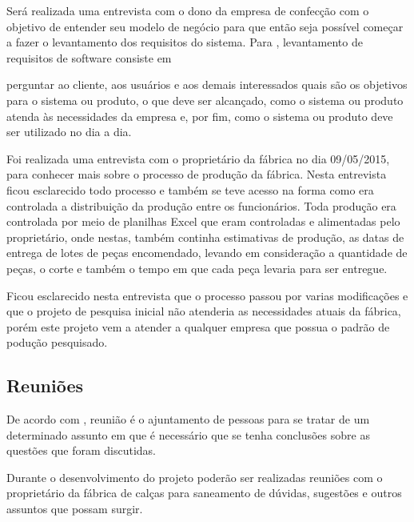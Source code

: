 \par Será realizada uma entrevista com o dono da empresa de confecção com o
objetivo de entender seu modelo de negócio para que então seja possível começar
a fazer o levantamento dos requisitos do sistema. Para
, levantamento de requisitos de
software consiste em

\begin{citacao}
perguntar ao cliente, aos usuários e aos demais interessados quais são os
objetivos para o sistema ou produto, o que deve ser alcançado, como o sistema ou
produto atenda às necessidades da empresa e, por fim, como o sistema ou produto
deve ser utilizado no dia a dia.
\end{citacao} 

\par Foi realizada uma entrevista com o proprietário da fábrica no dia
09/05/2015, para conhecer mais sobre o processo de produção da fábrica. Nesta
entrevista ficou esclarecido todo processo e também se teve acesso na
forma como era controlada a distribuição da produção entre os funcionários. Toda
produção era controlada por meio de planilhas Excel que eram
controladas e alimentadas pelo proprietário, onde nestas, também continha
estimativas de produção, as datas de entrega de lotes de peças encomendado,
levando em consideração a quantidade de peças, o corte e
também o tempo em que cada peça levaria para ser entregue.

\par Ficou esclarecido nesta entrevista que o processo passou por varias
modificações e que o projeto de pesquisa inicial não atenderia as necessidades
atuais da fábrica, porém este projeto vem a atender a qualquer empresa que
possua o padrão de podução pesquisado.


\subsection{Reuniões}
\par De acordo com , reunião é o ajuntamento de
pessoas para se tratar de um determinado assunto em que é necessário que se
tenha conclusões sobre as questões que foram discutidas.

\par Durante o desenvolvimento do projeto poderão ser realizadas reuniões
com o proprietário da fábrica de calças para saneamento de dúvidas, sugestões e
outros assuntos que possam surgir.

